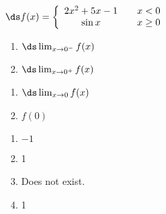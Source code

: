 {$\ds f(x) = \left\{\begin{array}{ccc}
	2x^2+5x-1 & & x<0 \\
	\sin x & & x\geq 0
	\end{array}
	\right.
$

\noindent\begin{minipage}[t]{.5\linewidth}
\begin{enumerate}
\item		$\ds \lim_{x\to 0^-} f(x)$
\item		$\ds \lim_{x\to 0^+} f(x)$
\end{enumerate}
\end{minipage}
\noindent\begin{minipage}[t]{.5\linewidth}
\begin{enumerate}\addtocounter{enumii}{2}
\item		$\ds \lim_{x\to 0} f(x)$
\item		$f(0)$\end{enumerate}
\end{minipage}
}
{\begin{enumerate}
\item		$-1$
\item		1
\item		Does not exist.
\item		1
\end{enumerate}
}


